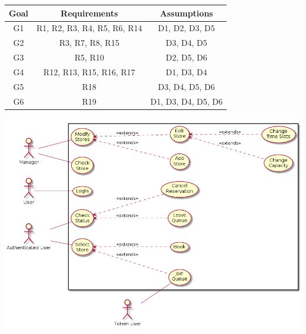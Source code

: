 \begin{center}
    \begin{tabular}{ |c||c|c| }
        \hline
        \textbf{Goal} & \textbf{Requirements} & \textbf{Assumptions} \\
        \hline
        G1 & R1, R2, R3, R4, R5, R6, R14 & D1, D2, D3, D5 \\ %
        \hline
        G2 & R3, R7, R8, R15 & D3, D4, D5 \\ %
        \hline
        G3 & R5, R10 & D2, D5, D6\\ %
        \hline
        G4 & R12, R13, R15, R16, R17 & D1, D3, D4 \\ %
        \hline
        G5 & R18 & D3, D4, D5, D6 \\ %
        \hline
        G6 & R19 & D1, D3, D4, D5, D6 \\ %
        \hline
    \end{tabular}
\end{center}

\begin{center}
    \includegraphics[width=0.9\columnwidth]{uml/usecase.png}
\end{center}



